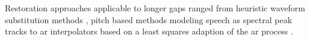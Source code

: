 Restoration approaches applicable to longer gaps ranged from heuristic waveform substitution methods \cite{Goodman1986}\cite{Niediwiecki2001}, pitch based methods modeling speech as spectral peak tracks \cite{Maher1994}\cite{McAulay1986} to \gls{ar} interpolators \cite{Esquef2006} based on a least squares adaption of the \gls{ar} process \cite{Godsill1998book}.









